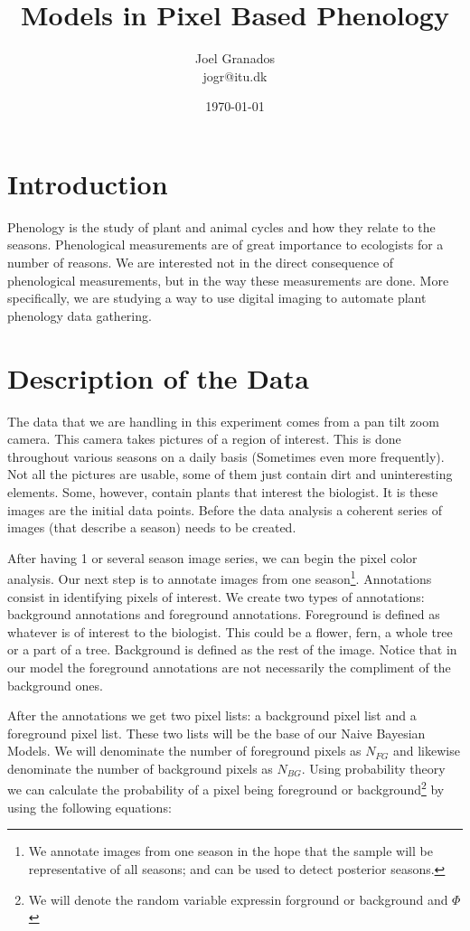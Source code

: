 \documentclass[a4paper,12pt]{report}
\begin{document}
\title{Models in Pixel Based Phenology}
\author{Joel Granados \\ jogr@itu.dk}
\date{ \today }

\maketitle

\section*{Introduction}
Phenology is the study of plant and animal cycles and how they relate to the
seasons. Phenological measurements are of great importance to ecologists for a
number of reasons. We are interested not in the direct consequence of
phenological measurements, but in the way these measurements are done. More
specifically, we are studying a way to use digital imaging to automate plant
phenology data gathering.

\section{Description of the Data}
The data that we are handling in this experiment comes from a pan tilt zoom
camera. This camera takes pictures of a region of interest. This is done
throughout various seasons on a daily basis (Sometimes even more frequently).
Not all the pictures are usable, some of them just contain dirt and
uninteresting elements. Some, however, contain plants that interest the
biologist. It is these images are the initial data points. Before the data
analysis a coherent series of images (that describe a season) needs to be
created.

After having 1 or several season image series, we can begin the pixel color
analysis. Our next step is to annotate images from one season\footnote{We
annotate images from one season in the hope that the sample will be
representative of all seasons; and can be used to detect posterior seasons.}.
Annotations consist in identifying pixels of interest.
We create two types of annotations: background annotations and foreground
annotations. Foreground is defined as whatever is of interest to
the biologist. This could be a flower, fern, a whole tree or a part of a tree.
Background is defined as the rest of the image. Notice that in our model the
foreground annotations are not necessarily the compliment of the background
ones.

After the annotations we get two pixel lists: a background pixel list and a
foreground pixel list. These two lists will be the base of our Naive Bayesian
Models. We will denominate the number of foreground pixels as $N_{FG}$ and
likewise denominate the number of background pixels as $N_{BG}$. Using probability
theory  we can calculate
the probability of a pixel being foreground or background\footnote{We will
denote the random variable expressin forground or background and $\Phi$}
by using the following equations:
\end{document}
